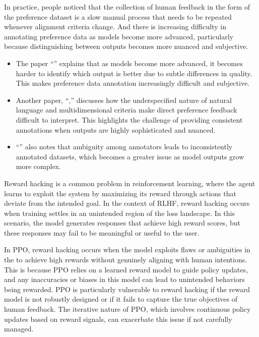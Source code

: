 \documentclass[letterpaper,11pt,english]{sphinxmanual}
\begin{document}
\sphinxAtStartPar
In practice, people noticed that the collection of human feedback in the
form of the preference dataset is a slow manual process that needs to be
repeated whenever alignment criteria change. And there is increasing
difficulty in annotating preference data as models become more advanced,
particularly because distinguishing between outputs becomes more nuanced
and subjective.
\begin{itemize}
\item {} 
\sphinxAtStartPar
The paper “”
explains that as models become more advanced, it becomes harder to
identify which output is better due to subtle differences in quality.
This makes preference data annotation increasingly difficult and
subjective.

\item {} 
\sphinxAtStartPar
Another paper, “,” discusses how
the underspecified nature of natural language and multidimensional
criteria make direct preference feedback difficult to interpret. This
highlights the challenge of providing consistent annotations when
outputs are highly sophisticated and nuanced.

\item {} 
\sphinxAtStartPar
“” also notes that
ambiguity among annotators leads to inconsistently annotated datasets,
which becomes a greater issue as model outputs grow more complex.

\end{itemize}

\sphinxAtStartPar
{}

\sphinxAtStartPar
Reward hacking is a common problem in reinforcement learning, where the
agent learns to exploit the system by maximizing its reward through
actions that deviate from the intended goal. In the context of RLHF,
reward hacking occurs when training settles in an unintended region of
the loss landscape. In this scenario, the model generates responses that
achieve high reward scores, but these responses may fail to be
meaningful or useful to the user.

\sphinxAtStartPar
In PPO, reward hacking occurs when the model exploits flaws or
ambiguities in the  to achieve high rewards without
genuinely aligning with human intentions. This is because PPO relies on
a learned reward model to guide policy updates, and any inaccuracies or
biases in this model can lead to unintended behaviors being rewarded.
PPO is particularly vulnerable to reward hacking if the reward model is
not robustly designed or if it fails to capture the true objectives of
human feedback. The iterative nature of PPO, which involves continuous
policy updates based on reward signals, can exacerbate this issue if not
carefully managed.
\end{document}
